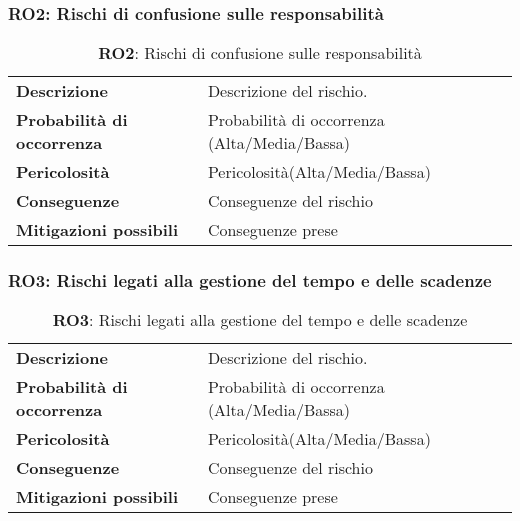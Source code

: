 \subsubsection{RO2: Rischi di confusione sulle responsabilità}
\begin{table}[h!]
    \centering
    \renewcommand{\arraystretch}{1.5} %
    \begin{tabularx}{\textwidth}{|X|X|}\hline
    \rowcolor[HTML]{FFD700} 
    \multicolumn{2}{|c|}{\textbf{Rischi di confusione sulle responsabilità}} \\ \hline
    \textbf{Descrizione} & Descrizione del rischio. \\ \hline
    \textbf{Probabilità di occorrenza} & Probabilità di occorrenza (Alta/Media/Bassa) \\ \hline
    \textbf{Pericolosità} & Pericolosità(Alta/Media/Bassa) \\ \hline
    \textbf{Conseguenze} & Conseguenze del rischio \\ \hline
    \textbf{Mitigazioni possibili} & Conseguenze prese \\ \hline
    \end{tabularx}
    \caption{\textbf{RO2}: Rischi di confusione sulle responsabilità}
    \end{table}

\subsubsection{RO3: Rischi legati alla gestione del tempo e delle scadenze}
\begin{table}[h!]
    \centering
    \renewcommand{\arraystretch}{1.5} %
    \begin{tabularx}{\textwidth}{|X|X|}\hline
    \rowcolor[HTML]{FFD700} 
    \multicolumn{2}{|c|}{\textbf{Rischi legati alla gestione del tempo e delle scadenze}} \\ \hline
    \textbf{Descrizione} & Descrizione del rischio. \\ \hline
    \textbf{Probabilità di occorrenza} & Probabilità di occorrenza (Alta/Media/Bassa) \\ \hline
    \textbf{Pericolosità} & Pericolosità(Alta/Media/Bassa) \\ \hline
    \textbf{Conseguenze} & Conseguenze del rischio \\ \hline
    \textbf{Mitigazioni possibili} & Conseguenze prese \\ \hline
    \end{tabularx}
    \caption{\textbf{RO3}: Rischi legati alla gestione del tempo e delle scadenze}
    \end{table}

